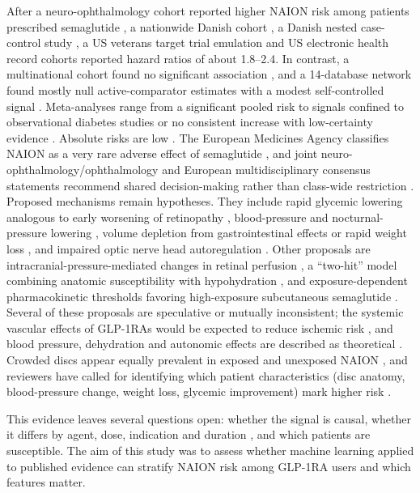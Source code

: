 \documentclass[journal]{IEEEtran}
\begin{document}
After a neuro-ophthalmology cohort reported higher NAION risk among
patients prescribed semaglutide \cite{p38958939, p40055951}, a
nationwide Danish cohort \cite{p39696569}, a Danish nested case-control
study \cite{p42126975}, a US veterans target trial emulation
\cite{p41678180} and US electronic health record cohorts
\cite{p40146102, p40788646} reported hazard ratios of about 1.8--2.4.
In contrast, a multinational cohort found no significant association
\cite{p39491755}, and a 14-database network found mostly null
active-comparator estimates with a modest self-controlled signal
\cite{p39976940}. Meta-analyses range from a significant pooled risk
\cite{p42060879, p40810985} to signals confined to observational
diabetes studies \cite{p41475544} or no consistent increase with
low-certainty evidence \cite{p41692115}. Absolute risks are low
\cite{p41678180, p42132708}. The European Medicines Agency classifies
NAION as a very rare adverse effect of semaglutide \cite{p41857480},
and joint neuro-ophthalmology/ophthalmology and European
multidisciplinary consensus statements recommend shared decision-making
rather than class-wide restriction \cite{p42132708, p41058255}.
Proposed mechanisms remain hypotheses. They include rapid glycemic
lowering analogous to early worsening of retinopathy
\cite{p40055951, p41857480}, blood-pressure and nocturnal-pressure
lowering \cite{p41857480}, volume depletion from gastrointestinal
effects or rapid weight loss \cite{p41678180, p42773534}, and impaired
optic nerve head autoregulation \cite{p41678180}. Other proposals are
intracranial-pressure-mediated changes in retinal perfusion
\cite{p42335513, p42866022}, a ``two-hit'' model combining anatomic
susceptibility with hypohydration \cite{p42547311}, and
exposure-dependent pharmacokinetic thresholds favoring high-exposure
subcutaneous semaglutide \cite{p42770962}. Several of these proposals
are speculative or mutually inconsistent; the systemic vascular effects
of GLP-1RAs would be expected to reduce ischemic risk \cite{p42866022},
and blood pressure, dehydration and autonomic effects are described as
theoretical \cite{p42890826}. Crowded discs appear equally prevalent in
exposed and unexposed NAION \cite{p42556433}, and reviewers have called
for identifying which patient characteristics (disc anatomy,
blood-pressure change, weight loss, glycemic improvement) mark higher
risk \cite{p41022666}.

This evidence leaves several questions open: whether the signal is
causal, whether it differs by agent, dose, indication and duration
\cite{p42126975, p42770962}, and which patients are susceptible. The
aim of this study was to assess whether machine learning applied to
published evidence can stratify NAION risk among GLP-1RA users and which
features matter.
\end{document}
